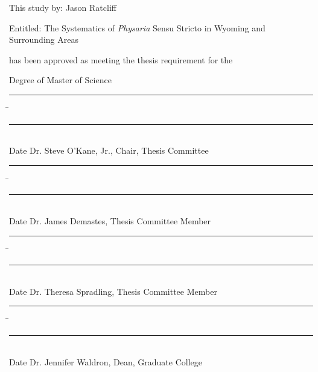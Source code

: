 \clearpage
\pagestyle{contents} %
\setcounter{page}{2}    %
This study by: Jason Ratcliff

Entitled: The Systematics of \textit{Physaria} Sensu Stricto in Wyoming and Surrounding Areas

\vspace*{33pt}

has been approved as meeting the thesis requirement for the

Degree of Master of Science

\vspace*{22pt}

\singlespacing
\begin{noindent}
\begin{tabbing}
\rule{2.4cm}{0.4pt} \hspace{1.33782cm} \= \rule{11cm}{0.4pt}\\
Date \> Dr. Steve O'Kane, Jr., Chair, Thesis Committee\\
\end{tabbing}

\begin{tabbing}
\rule{2.4cm}{0.4pt} \hspace{1.33782cm} \= \rule{11cm}{0.4pt}\\
Date \> Dr. James Demastes, Thesis Committee Member\\
\end{tabbing}

\begin{tabbing}
\rule{2.4cm}{0.4pt} \hspace{1.33782cm} \= \rule{11cm}{0.4pt}\\
Date \> Dr. Theresa Spradling, Thesis Committee Member\\
\end{tabbing}

\begin{tabbing}
\rule{2.4cm}{0.4pt} \hspace{1.33782cm} \= \rule{11cm}{0.4pt}\\
Date \> Dr. Jennifer Waldron, Dean, Graduate College\\
\end{tabbing}
\end{noindent}
\doublespacing
